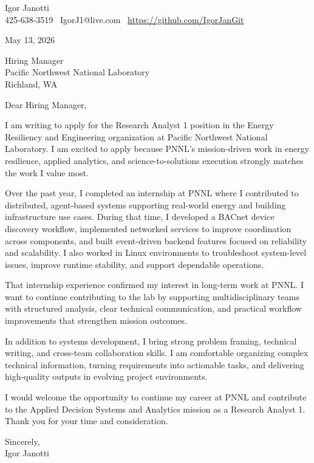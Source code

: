 \documentclass[11pt]{article}
\begin{document}
Igor Janotti\\
425-638-3519 \textbar\ IgorJ1@live.com \textbar\ \url{https://github.com/IgorJanGit}

May 13, 2026

Hiring Manager\\
Pacific Northwest National Laboratory\\
Richland, WA

Dear Hiring Manager,

I am writing to apply for the Research Analyst 1 position in the Energy Resiliency and Engineering organization at Pacific Northwest National Laboratory. I am excited to apply because PNNL's mission-driven work in energy resilience, applied analytics, and science-to-solutions execution strongly matches the work I value most.

Over the past year, I completed an internship at PNNL where I contributed to distributed, agent-based systems supporting real-world energy and building infrastructure use cases. During that time, I developed a BACnet device discovery workflow, implemented networked services to improve coordination across components, and built event-driven backend features focused on reliability and scalability. I also worked in Linux environments to troubleshoot system-level issues, improve runtime stability, and support dependable operations.

That internship experience confirmed my interest in long-term work at PNNL. I want to continue contributing to the lab by supporting multidisciplinary teams with structured analysis, clear technical communication, and practical workflow improvements that strengthen mission outcomes.

In addition to systems development, I bring strong problem framing, technical writing, and cross-team collaboration skills. I am comfortable organizing complex technical information, turning requirements into actionable tasks, and delivering high-quality outputs in evolving project environments.

I would welcome the opportunity to continue my career at PNNL and contribute to the Applied Decision Systems and Analytics mission as a Research Analyst 1. Thank you for your time and consideration.

Sincerely,\\
Igor Janotti
\end{document}

